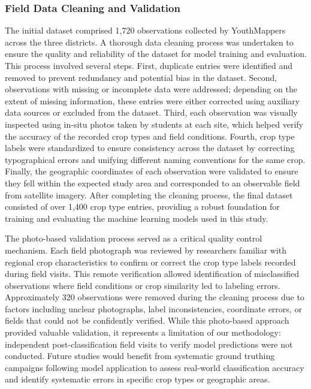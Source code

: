 \documentclass[
  journal,
  twocolumn]{IEEEtran}
\begin{document}
\hypertarget{field-data-cleaning-and-validation}{%
\subsubsection{Field Data Cleaning and
Validation}\label{field-data-cleaning-and-validation}}

The initial dataset comprised 1,720 observations collected by
YouthMappers across the three districts. A thorough data cleaning
process was undertaken to ensure the quality and reliability of the
dataset for model training and evaluation. This process involved several
steps. First, duplicate entries were identified and removed to prevent
redundancy and potential bias in the dataset. Second, observations with
missing or incomplete data were addressed; depending on the extent of
missing information, these entries were either corrected using auxiliary
data sources or excluded from the dataset. Third, each observation was
visually inspected using in-situ photos taken by students at each site,
which helped verify the accuracy of the recorded crop types and field
conditions. Fourth, crop type labels were standardized to ensure
consistency across the dataset by correcting typographical errors and
unifying different naming conventions for the same crop. Finally, the
geographic coordinates of each observation were validated to ensure they
fell within the expected study area and corresponded to an observable
field from satellite imagery. After completing the cleaning process, the
final dataset consisted of over 1,400 crop type entries, providing a
robust foundation for training and evaluating the machine learning
models used in this study.

The photo-based validation process served as a critical quality control
mechanism. Each field photograph was reviewed by researchers familiar
with regional crop characteristics to confirm or correct the crop type
labels recorded during field visits. This remote verification allowed
identification of misclassified observations where field conditions or
crop similarity led to labeling errors. Approximately 320 observations
were removed during the cleaning process due to factors including
unclear photographs, label inconsistencies, coordinate errors, or fields
that could not be confidently verified. While this photo-based approach
provided valuable validation, it represents a limitation of our
methodology: independent post-classification field visits to verify
model predictions were not conducted. Future studies would benefit from
systematic ground truthing campaigns following model application to
assess real-world classification accuracy and identify systematic errors
in specific crop types or geographic areas.
\end{document}
